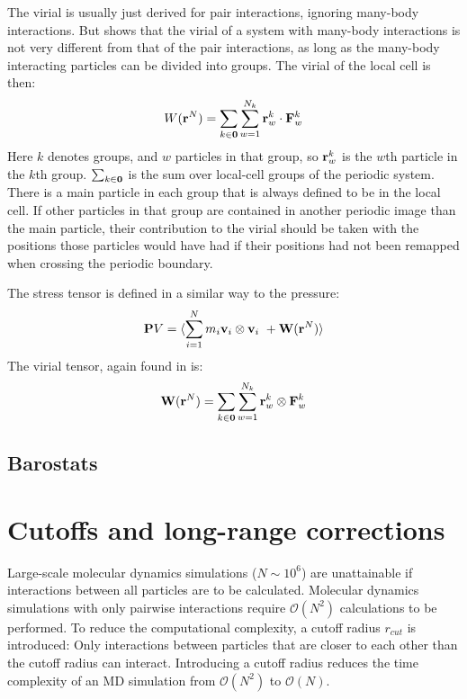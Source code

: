 The virial is usually just derived for pair interactions, ignoring many-body interactions. But \citet{Thompson2009} shows that the virial of a system with many-body interactions is not very different from that of the pair interactions, as long as the many-body interacting particles can be divided into groups. The virial of the local cell is then:
\begin{equation}
	W(\mathbf{r}^N) = \sum_{k\in\mathbf{0}}\sum_{w=1}^{N_k} \mathbf{r}^k_w \cdot \mathbf{F}^k_w
\end{equation}
Here $k$ denotes groups, and $w$ particles in that group, so $\mathbf{r}^k_w$ is the $w$th particle in the $k$th group. $\sum_{k \in \mathbf{0}}$ is the sum over local-cell groups of the periodic system. There is a main particle in each group that is always defined to be in the local cell. If other particles in that group are contained in another periodic image than the main particle, their contribution to the virial should be taken with the positions those particles would have had if their positions had not been remapped when crossing the periodic boundary.

The stress tensor is defined in a similar way to the pressure:
\begin{equation}
	\mathbf{P} V = \langle \sum_{i=1}^N m_i \mathbf{v}_i \otimes \mathbf{v}_i \ + \mathbf{W}(\mathbf{r}^N)\rangle
\end{equation}
The virial tensor, again found in \citet{Thompson2009} is:
\begin{equation}
	\mathbf{W}(\mathbf{r}^N) = \sum_{k \in \mathbf{0}} \sum_{w=1}^{N_k} \mathbf{r}_w^k \otimes \mathbf{F}^k_w
\end{equation}

\subsection{Barostats}

\section{Cutoffs and long-range corrections}
Large-scale molecular dynamics simulations ($N \sim 10^6$) are unattainable if interactions between all particles are to be calculated. Molecular dynamics simulations with only pairwise interactions require $\mathcal{O}(N^2)$ calculations to be performed. To reduce the computational complexity, a cutoff radius $r_{cut}$ is introduced: Only interactions between particles that are closer to each other than the cutoff radius can interact. Introducing a cutoff radius reduces the time complexity of an MD simulation from $\mathcal{O}(N^2)$ to $\mathcal{O}(N)$. 

